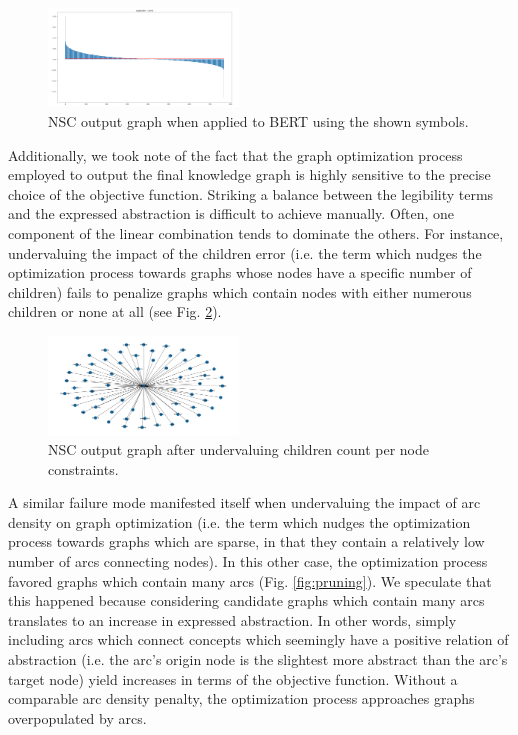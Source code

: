 \begin{figure}[h]
    \centering
    \includegraphics[width=0.45\textwidth]{img/spectrum.png}
    \caption{NSC output graph when applied to BERT using the shown symbols.}\label{fig:spectrum}
\end{figure}

Additionally, we took note of the fact that the graph optimization process employed to output the final knowledge graph is highly sensitive to the precise choice of the objective function. Striking a balance between the legibility terms and the expressed abstraction is difficult to achieve manually. Often, one component of the linear combination tends to dominate the others. For instance, undervaluing the impact of the children error (i.e. the term which nudges the optimization process towards graphs whose nodes have a specific number of children) fails to penalize graphs which contain nodes with either numerous children or none at all (see Fig. \ref{fig:children}).

\begin{figure}[h]
    \centering
    \includegraphics[width=0.45\textwidth]{img/too_much_pruning.png}
    \caption{NSC output graph after undervaluing children count per node constraints.}\label{fig:children}
\end{figure}

A similar failure mode manifested itself when undervaluing the impact of arc density on graph optimization (i.e. the term which nudges the optimization process towards graphs which are sparse, in that they contain a relatively low number of arcs connecting nodes). In this other case, the optimization process favored graphs which contain many arcs (Fig. \ref{fig:pruning}). We speculate that this happened because considering candidate graphs which contain many arcs translates to an increase in expressed abstraction. In other words, simply including arcs which connect concepts which seemingly have a positive relation of abstraction (i.e. the arc's origin node is the slightest more abstract than the arc's target node) yield increases in terms of the objective function. Without a comparable arc density penalty, the optimization process approaches graphs overpopulated by arcs.

